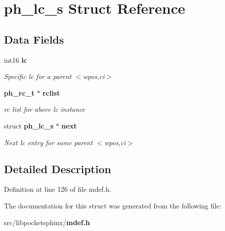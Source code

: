 \section{ph\-\_\-lc\-\_\-s Struct Reference}
\label{structph__lc__s}
\subsection*{Data Fields}
\begin{DoxyCompactItemize}
\item 
int16 {\bf lc}\label{structph__lc__s_adfb4e9553a4e2314543f9f1ef661185e}

\begin{DoxyCompactList}\small\item\em Specific lc for a parent $<$wpos,ci$>$ \end{DoxyCompactList}\item 
{\bf ph\-\_\-rc\-\_\-t} $\ast$ {\bf rclist}\label{structph__lc__s_aac24b848d70d96894c312d16050c4051}

\begin{DoxyCompactList}\small\item\em rc list for above lc instance \end{DoxyCompactList}\item 
struct {\bf ph\-\_\-lc\-\_\-s} $\ast$ {\bf next}\label{structph__lc__s_a5cda7044037678163c2242dde19df13a}

\begin{DoxyCompactList}\small\item\em Next lc entry for same parent $<$wpos,ci$>$ \end{DoxyCompactList}\end{DoxyCompactItemize}


\subsection{Detailed Description}


Definition at line 126 of file mdef.\-h.



The documentation for this struct was generated from the following file\-:\begin{DoxyCompactItemize}
\item 
src/libpocketsphinx/{\bf mdef.\-h}\end{DoxyCompactItemize}
